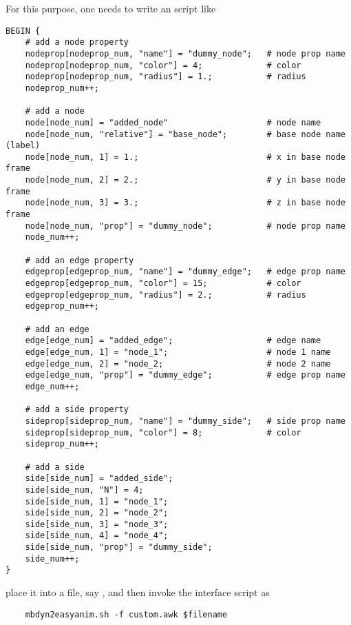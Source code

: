 For this purpose, one needs to write an  script like
\begin{verbatim}
BEGIN {
    # add a node property
    nodeprop[nodeprop_num, "name"] = "dummy_node";   # node prop name
    nodeprop[nodeprop_num, "color"] = 4;             # color
    nodeprop[nodeprop_num, "radius"] = 1.;           # radius
    nodeprop_num++;

    # add a node
    node[node_num] = "added_node"                    # node name
    node[node_num, "relative"] = "base_node";        # base node name (label)
    node[node_num, 1] = 1.;                          # x in base node frame
    node[node_num, 2] = 2.;                          # y in base node frame
    node[node_num, 3] = 3.;                          # z in base node frame
    node[node_num, "prop"] = "dummy_node";           # node prop name
    node_num++;

    # add an edge property
    edgeprop[edgeprop_num, "name"] = "dummy_edge";   # edge prop name
    edgeprop[edgeprop_num, "color"] = 15;            # color
    edgeprop[edgeprop_num, "radius"] = 2.;           # radius
    edgeprop_num++;

    # add an edge
    edge[edge_num] = "added_edge";                   # edge name
    edge[edge_num, 1] = "node_1";                    # node 1 name
    edge[edge_num, 2] = "node_2;                     # node 2 name
    edge[edge_num, "prop"] = "dummy_edge";           # edge prop name
    edge_num++;

    # add a side property
    sideprop[sideprop_num, "name"] = "dummy_side";   # side prop name
    sideprop[sideprop_num, "color"] = 8;             # color
    sideprop_num++;

    # add a side
    side[side_num] = "added_side";
    side[side_num, "N"] = 4;
    side[side_num, 1] = "node_1";
    side[side_num, 2] = "node_2";
    side[side_num, 3] = "node_3";
    side[side_num, 4] = "node_4";
    side[side_num, "prop"] = "dummy_side";
    side_num++;
}
\end{verbatim}
place it into a file, say ,
and then invoke the interface script as
\begin{verbatim}
    mbdyn2easyanim.sh -f custom.awk $filename
\end{verbatim}



\begin{comment} %
\section{Altair MotionView}
Support for Altair's MotionView must be enabled at configure time, 
by using the directive \kw{--enable-motionview};
the specific client libraries are required.
It should generate a binary model and results file compatible
with MotionView.
It is activated by the directive
\begin{verbatim}
    output results : motion view ;
\end{verbatim}
No special parameters are available at the moment; 
this interface is under development.
\end{comment} %

